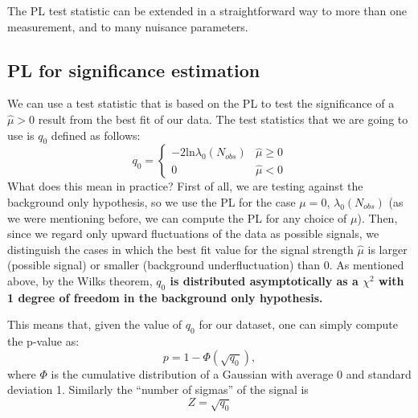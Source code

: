 \documentclass[a4paper,12pt]{article}
\begin{document}
The PL test statistic can be extended in a straightforward way to more than
one measurement, and to many nuisance parameters.

\subsection{PL for significance estimation}
We can use a test statistic that is based on the PL to test the significance
of a $\hat{\mu}>0$ result from the best fit of our data. The test statistics
that we are going to use is $q_{0}$ defined as follows:
\begin{equation}
q_0=\begin{cases}
-2\mathrm{ln}\lambda_0(N_{obs}) & \hat{\mu}\geq0 \\
0 & \hat{\mu}<0
\end{cases}
\label{eq:teststat_signif}
\end{equation}
What does this mean in practice? First of all, we are testing against the
background only hypothesis, so we use the PL for the case $\mu=0$,
$\lambda_0(N_{obs})$ (as we were mentioning before, we can compute the PL for
any choice of $\mu$).
Then, since we regard only upward fluctuations of the data as possible
signals, we distinguish the cases in which the best fit value for the signal
strength $\hat{\mu}$ is larger (possible signal) or smaller (background
underfluctuation) than 0. 
As mentioned above, by the Wilks theorem, {\bf $q_0$ is distributed
asymptotically as a $\chi^2$ with 1 degree of freedom in the background only
hypothesis.} 

This means that, given the value of $q_0$ for our dataset, one can simply
compute the p-value as:
\begin{equation}
p=1-\Phi(\sqrt{q_0}),
\end{equation}
where $\Phi$ is the cumulative distribution of a Gaussian with average 0 and
standard deviation 1. Similarly the ``number of sigmas'' of the signal is 
\begin{equation}
Z=\sqrt{q_0}
\end{equation}
\end{document}
